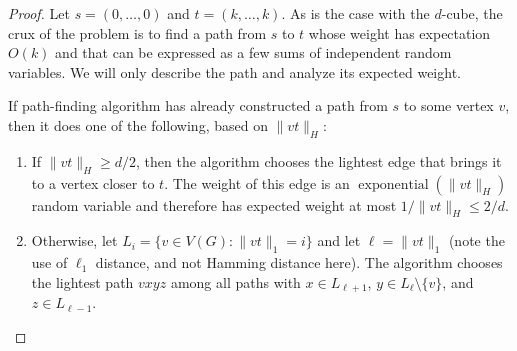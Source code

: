 \documentclass{patmorin}
\DeclareMathOperator{\exponential}{exponential}
\begin{document}
\begin{proof}
Let $s=(0,\ldots,0)$ and $t=(k,\ldots,k)$.  As is the case with the
$d$-cube, the crux of the problem is to find a path from $s$ to $t$
whose weight has expectation $O(k)$ and that can be expressed as a few
sums of independent random variables. We will only describe the path and
analyze its expected weight.

If path-finding algorithm has already constructed a path from $s$ to
some vertex $v$, then it does one of the following, based on $\|vt\|_H$:
\begin{enumerate}

  \item If $\|vt\|_H \ge d/2$, then the algorithm chooses the lightest 
    edge that brings it to a vertex closer to $t$.  The weight of this
    edge is an $\exponential(\|vt\|_H)$ random variable and therefore has
    expected weight at most $1/\|vt\|_H \le 2/d$.

  \item Otherwise, let $L_i = \{v\in V(G): \|vt\|_1=i\}$ and let
    $\ell=\|vt\|_1$ (note the use of $\ell_1$ distance, and not Hamming
    distance here).  The algorithm chooses the lightest path $vxyz$ among
    all paths with $x\in L_{\ell+1}$,  $y\in L_{\ell}\setminus\{v\}$,
    and $z\in L_{\ell-1}$.


\end{enumerate}
\end{proof}
\end{document}

